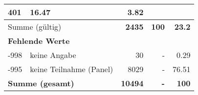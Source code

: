 \begin{longtable}{lXrrr}
       \num{401} &
       \num[round-mode=places,round-precision=2]{16,47} &
         \num[round-mode=places,round-precision=2]{3,82} \\
     \midrule
     \multicolumn{2}{l}{Summe (gültig)} &
       \textbf{\num{2435}} &
     \textbf{100} &
       \textbf{\num[round-mode=places,round-precision=2]{23,2}} \\
     \multicolumn{5}{l}{\textbf{Fehlende Werte}}\\
       -998 &
       keine Angabe &
         \num{30} &
        - &
         \num[round-mode=places,round-precision=2]{0,29} \\
       -995 &
       keine Teilnahme (Panel) &
         \num{8029} &
        - &
         \num[round-mode=places,round-precision=2]{76,51} \\
     \midrule
     \multicolumn{2}{l}{\textbf{Summe (gesamt)}} &
          \textbf{\num{10494}} &
        \textbf{-} &
        \textbf{100} \\
     \bottomrule
     \end{longtable}
     
